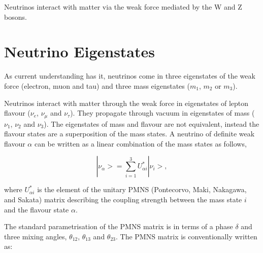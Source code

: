 Neutrinos interact with matter via the weak force mediated by the W
and Z bosons.

\section{Neutrino Eigenstates}

As current understanding has it, neutrinos come in three eigenstates
of the weak force (electron, muon and tau) and three mass eigenstates
($m_1$, $m_2$ or $m_3$).  

Neutrinos interact with matter through the weak force in eigenstates
of lepton flavour ($\nu_e$, $\nu_{\mu}$ and $\nu_{\tau}$). They
propagate through vacuum in eigenstates of mass ($\nu_1$, $\nu_2$ and
$\nu_3$). The eigenstates of mass and flavour are not equivalent,
instead the flavour states are a superposition of the mass states.  
A neutrino of definite weak flavour $\alpha$ can be written as a
linear combination of the mass states as follows, 

\begin{equation}
|\nu_{\alpha}> = \sum_{i=1}^{3} U^{*}_{\alpha i}|\nu_i>,
\end{equation}

\noindent where $U^* _{\alpha i}$ is the element of the unitary PMNS
(Pontecorvo, Maki, Nakagawa, and Sakata) matrix describing the
coupling strength between the mass state $i$ and the flavour state
$\alpha$.  

The standard parametrisation of the PMNS matrix is in terms of a phase
$\delta$ and three mixing angles, $\theta_{12}$, $\theta_{13}$ and
$\theta_{23}$. The PMNS matrix is conventionally written as: 

